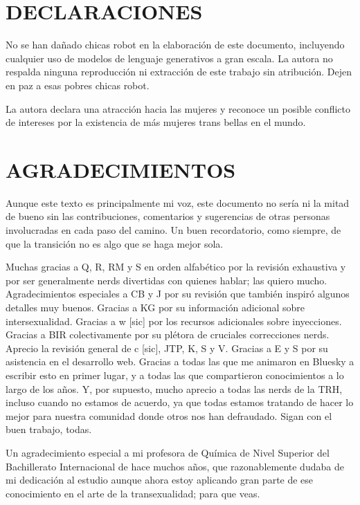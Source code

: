 \documentclass{article}
\begin{document}
\section*{DECLARACIONES}

No se han dañado chicas robot en la elaboración de este documento, incluyendo cualquier uso de modelos de lenguaje generativos a gran escala. La autora no respalda ninguna reproducción ni extracción de este trabajo sin atribución. Dejen en paz a esas pobres chicas robot.

La autora declara una atracción hacia las mujeres y reconoce un posible conflicto de intereses por la existencia de más mujeres trans bellas en el mundo.



\section*{AGRADECIMIENTOS}

Aunque este texto es principalmente mi voz, este documento no sería ni la mitad de bueno sin las contribuciones, comentarios y sugerencias de otras personas involucradas en cada paso del camino. Un buen recordatorio, como siempre, de que la transición no es algo que se haga mejor sola.

Muchas gracias a Q, R, RM y S en orden alfabético por la revisión exhaustiva y por ser generalmente nerds divertidas con quienes hablar; las quiero mucho. Agradecimientos especiales a CB y J por su revisión que también inspiró algunos detalles muy buenos. Gracias a KG por su información adicional sobre intersexualidad. Gracias a w [sic] por los recursos adicionales sobre inyecciones. Gracias a BIR colectivamente por su plétora de cruciales correcciones nerds. Aprecio la revisión general de c [sic], JTP, K, S y V. Gracias a E y S por su asistencia en el desarrollo web. Gracias a todas las que me animaron en Bluesky a escribir esto en primer lugar, y a todas las que compartieron conocimientos a lo largo de los años. Y, por supuesto, mucho aprecio a todas las nerds de la TRH, incluso cuando no estamos de acuerdo, ya que todas estamos tratando de hacer lo mejor para nuestra comunidad donde otros nos han defraudado. Sigan con el buen trabajo, todas.

Un agradecimiento especial a mi profesora de Química de Nivel Superior del Bachillerato Internacional de hace muchos años, que razonablemente dudaba de mi dedicación al estudio aunque ahora estoy aplicando gran parte de ese conocimiento en el arte de la transexualidad; para que veas.
\end{document}
